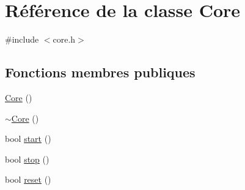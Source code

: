 \hypertarget{classCore}{\section{Référence de la classe Core}
\label{classCore}
}


{\ttfamily \#include $<$core.\-h$>$}

\subsection*{Fonctions membres publiques}
\begin{DoxyCompactItemize}
\item 
\hyperlink{classCore_a14e63188e0aa7c4a6f72d5501384d1f9}{Core} ()
\item 
\hyperlink{classCore_a776f8c46504b14183883c6273f93eaed}{$\sim$\-Core} ()
\item 
bool \hyperlink{classCore_a722434c9873d07d6b26a74e40e08eb9c}{start} ()
\item 
bool \hyperlink{classCore_a01ec355d4fc9be14623bb7b249ad9562}{stop} ()
\item 
bool \hyperlink{classCore_a85d7a4a5672973830aa10185b121ded9}{reset} ()
\end{DoxyCompactItemize}
